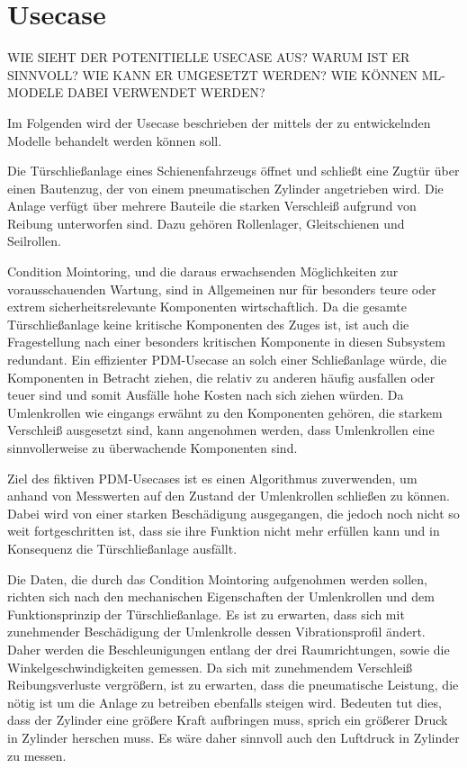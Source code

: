 \chapter{Usecase}
\label{ch:usecase}
WIE SIEHT DER POTENITIELLE USECASE AUS? WARUM IST ER SINNVOLL? WIE KANN ER UMGESETZT WERDEN? WIE KÖNNEN ML-MODELE DABEI VERWENDET WERDEN?

Im Folgenden wird der Usecase beschrieben der mittels der zu entwickelnden Modelle behandelt werden können soll.

Die Türschließanlage eines Schienenfahrzeugs öffnet und schließt eine Zugtür über einen Bautenzug, der von einem pneumatischen Zylinder angetrieben wird. Die Anlage verfügt über mehrere Bauteile die starken Verschleiß aufgrund von Reibung unterworfen sind. Dazu gehören Rollenlager, Gleitschienen und Seilrollen. 

Condition Mointoring, und die daraus erwachsenden Möglichkeiten zur vorausschauenden Wartung, sind in Allgemeinen nur für besonders teure oder extrem sicherheitsrelevante Komponenten wirtschaftlich. Da die gesamte Türschließanlage keine kritische Komponenten des Zuges ist, ist auch die Fragestellung nach einer besonders kritischen Komponente in diesen Subsystem redundant. Ein effizienter PDM-Usecase an solch einer Schließanlage würde, die Komponenten in Betracht ziehen, die relativ zu anderen häufig ausfallen oder teuer sind und somit Ausfälle hohe Kosten nach sich ziehen würden. Da Umlenkrollen wie eingangs erwähnt zu den Komponenten gehören, die starkem Verschleiß ausgesetzt sind, kann angenohmen werden, dass Umlenkrollen eine sinnvollerweise zu überwachende Komponenten sind. 

Ziel des fiktiven PDM-Usecases ist es einen Algorithmus zuverwenden, um anhand von Messwerten auf den Zustand der Umlenkrollen schließen zu können. Dabei wird von einer starken Beschädigung ausgegangen, die jedoch noch nicht so weit fortgeschritten ist, dass sie ihre Funktion nicht mehr erfüllen kann und in Konsequenz die Türschließanlage ausfällt. 

Die Daten, die durch das Condition Mointoring aufgenohmen werden sollen, richten sich nach den mechanischen Eigenschaften der Umlenkrollen und dem Funktionsprinzip der Türschließanlage. Es ist zu erwarten, dass sich mit zunehmender Beschädigung der Umlenkrolle dessen Vibrationsprofil ändert. Daher werden die Beschleunigungen entlang der drei Raumrichtungen, sowie die Winkelgeschwindigkeiten gemessen. 
Da sich mit zunehmendem Verschleiß Reibungsverluste vergrößern, ist zu erwarten, dass die pneumatische Leistung, die nötig ist um die Anlage zu betreiben ebenfalls steigen wird. Bedeuten tut dies, dass der Zylinder eine größere Kraft aufbringen muss, sprich ein größerer Druck in Zylinder herschen muss. Es wäre daher sinnvoll auch den Luftdruck in Zylinder zu messen.

